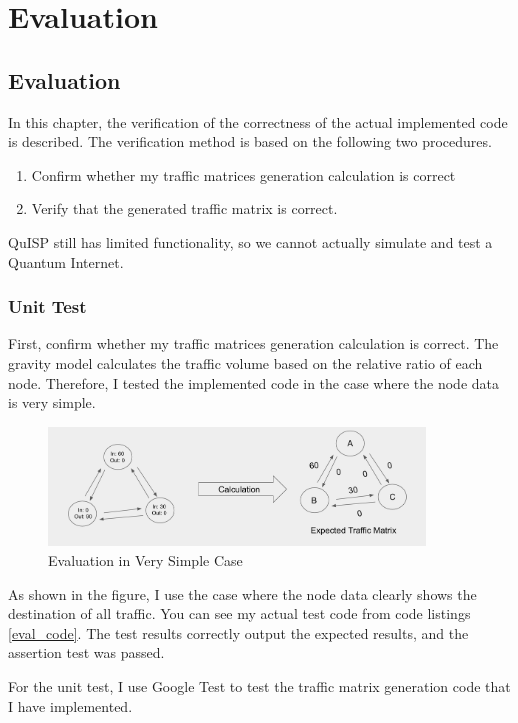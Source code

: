 \chapter{Evaluation}
\label{evaluation}

\section{Evaluation}
In this chapter, the verification of the correctness of the actual implemented code is described. 
The verification method is based on the following two procedures.

\begin{enumerate}
    \item Confirm whether my traffic matrices generation calculation is correct
    \item Verify that the generated traffic matrix is correct.
\end{enumerate}

QuISP still has limited functionality, so we cannot actually simulate and test a Quantum Internet.

\subsection{Unit Test}

First, confirm whether my traffic matrices generation calculation is correct.
The gravity model calculates the traffic volume based on the relative ratio of each node.
Therefore, I tested the implemented code in the case where the node data is very simple.
\begin{figure}[H]
    \centering
    \includegraphics[width=10cm]{img/Simple_evaluation.png}
    \caption{Evaluation in Very Simple Case}
    \label{fig:eval_simple} 
\end{figure}
As shown in the figure, I use the case where the node data clearly shows the destination of all traffic.
You can see my actual test code from code listings \ref{eval_code}.
The test results correctly output the expected results, and the assertion test was passed.

For the unit test, I use Google Test to test the traffic matrix generation code that I have implemented.

